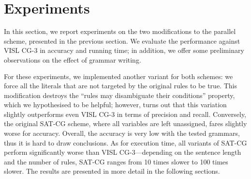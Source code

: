 






\section{Experiments}
\label{sec:eval}

In this section, we report experiments on the two modifications to the parallel scheme,
presented in the previous section. 
We evaluate the performance against VISL CG-3 in accuracy and running time; in addition, we offer some preliminary observations on the effect of grammar writing.

For these experiments, we implemented another variant for both schemes: 
we force all the literals that are not targeted by the original rules to be true.
This modification destroys the ``rules may disambiguate their conditions'' property, 
which we hypothesised to be helpful; however, turns out that this variation 
slightly outperforms even VISL CG-3 in terms of precision and recall.
Conversely, the original SAT-CG scheme, where all variables are left unassigned,
fares slightly worse for accuracy.
Overall, the accuracy is very low with the tested grammars, thus it is hard to draw conclusions.
As for execution time, all variants of SAT-CG perform significantly worse than VISL CG-3---depending on the sentence length and the number of rules, SAT-CG ranges from 10 times slower to 100 times slower.
The results are presented in more detail in the following sections.


